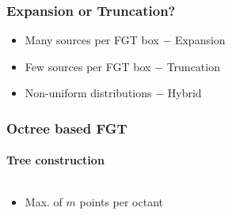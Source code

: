 
\begin{frame}
\frametitle{Expansion or Truncation?}
\begin{itemize}
\item Many sources per FGT box $-$ Expansion
\newline
\item Few sources per FGT box $-$ Truncation
\newline
\item Non-uniform distributions $-$ Hybrid
\end{itemize}
\end{frame}


\begin{frame}
\frametitle{Octree based FGT}
\framesubtitle{Tree construction}
\begin{columns}[T]
\begin{column}{0.4\textwidth}
\begin{itemize}
\item Max. of $m$ points per octant
\end{itemize}
\end{column}
\begin{column}{0.6\textwidth}
 {

}
 {

}
 {

}
\end{column}
\end{columns}
\end{frame}


